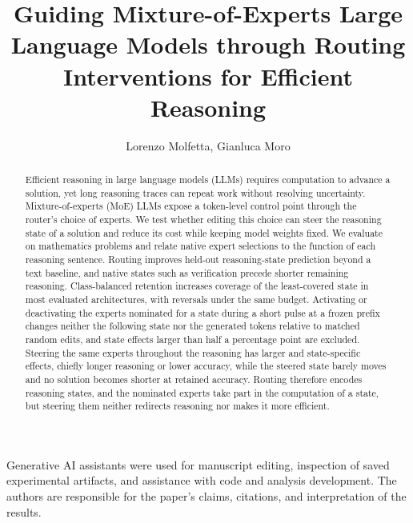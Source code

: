 \documentclass{clv2025}
\begin{document}
\title{Guiding Mixture-of-Experts Large Language Models through Routing Interventions for Efficient Reasoning}
\author{Lorenzo Molfetta, Gianluca Moro}
\maketitle

\begin{abstract}
Efficient reasoning in large language models (LLMs) requires computation to advance a solution, yet long reasoning traces can repeat work without resolving uncertainty.
%
Mixture-of-experts (MoE) LLMs expose a token-level control point through the router's choice of experts.
%
We test whether editing this choice can steer the reasoning state of a solution and reduce its cost while keeping model weights fixed.
%
We evaluate on mathematics problems and relate native expert selections to the function of each reasoning sentence.
%
Routing improves held-out reasoning-state prediction beyond a text baseline, and native states such as verification precede shorter remaining reasoning.
%
Class-balanced retention increases coverage of the least-covered state in most evaluated architectures, with reversals under the same budget.
%
Activating or deactivating the experts nominated for a state during a short pulse at a frozen prefix changes neither the following state nor the generated tokens relative to matched random edits, and state effects larger than half a percentage point are excluded.
%
Steering the same experts throughout the reasoning has larger and state-specific effects, chiefly longer reasoning or lower accuracy, while the steered state barely moves and no solution becomes shorter at retained accuracy.
%
Routing therefore encodes reasoning states, and the nominated experts take part in the computation of a state, but steering them neither redirects reasoning nor makes it more efficient.
\end{abstract}








\begin{acknowledgments}
Generative AI assistants were used for manuscript editing, inspection of saved experimental artifacts, and assistance with code and analysis development.
%
The authors are responsible for the paper's claims, citations, and interpretation of the results.
%
\end{acknowledgments}




\clearpage
\appendix

\renewcommand{\thesection}{\Alph{section}}

\end{document}
